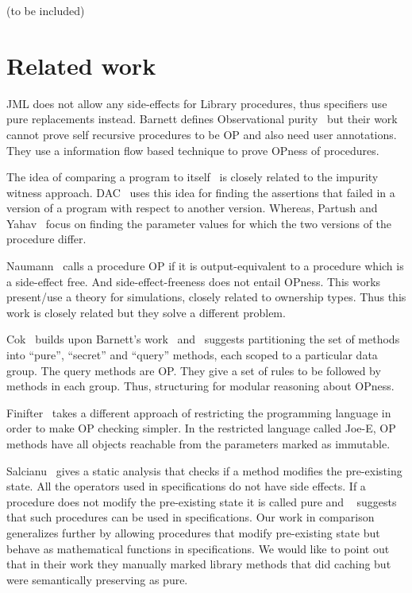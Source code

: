 \documentclass{llncs}
\begin{document}
(to be included)
\section{Related work}
JML does not allow any side-effects for Library procedures, thus
specifiers use pure replacements instead. Barnett defines
Observational purity~\cite{barnett200499} but their work cannot prove
self recursive procedures to be OP and also need user
annotations. They use a information flow based technique to prove
OPness of procedures.

The idea of comparing a program to
itself~\cite{lahiri2013differential} \cite{partush2013abstract} is
closely related to the impurity witness
approach. DAC~\cite{lahiri2013differential} uses this idea for finding
the assertions that failed in a version of a program with respect to
another version. Whereas, Partush and Yahav~\cite{partush2013abstract}
focus on finding the parameter values for which the two versions of
the procedure differ.

Naumann~\cite{naumann2007observational} calls a procedure OP if it is
output-equivalent to a procedure which is a side-effect free. And
side-effect-freeness does not entail OPness. This works present/use a
theory for simulations, closely related to ownership types. Thus this
work is closely related but they solve a different problem.

Cok~\cite{cok2008extensions} builds upon Barnett's
work~\cite{barnett2006allowing} and~\cite{barnett200499} suggests
partitioning the set of methods into ``pure'', ``secret'' and
``query'' methods, each scoped to a particular data group. The query
methods are OP. They give a set of rules to be followed by methods in
each group. Thus, structuring for modular reasoning about OPness.

Finifter~\cite{cok2008extensions} takes a different approach of
restricting the programming language in order to make OP checking
simpler. In the restricted language called Joe-E, OP methods have all
objects reachable from the parameters marked as immutable.

Salcianu~\cite{sualcianu2005purity} gives a static analysis that
checks if a method modifies the pre-existing state. All the operators
used in specifications do not have side effects. If a procedure does
not modify the pre-existing state it is called pure and
~\cite{barnett200499} suggests that such procedures can be used in
specifications. Our work in comparison generalizes further by allowing
procedures that modify pre-existing state but behave as mathematical
functions in specifications. We would like to point out that in their
work they manually marked library methods that did caching but were
semantically preserving as pure.
\end{document}
